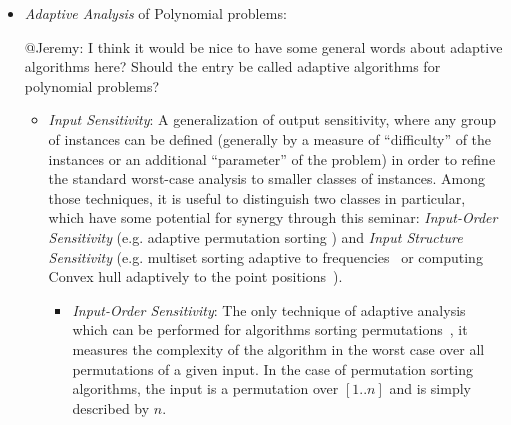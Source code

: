 \documentclass[a4paper,10pt]{article}
\begin{document}
\begin{itemize}

\item \emph{Adaptive Analysis} of Polynomial problems:
\begin{TODO}
\begin{STEFAN}
@Jeremy: I think it would be nice to have some general words about adaptive algorithms here? Should the entry be called adaptive algorithms for polynomial problems?
\end{STEFAN}
\end{TODO}
  \begin{itemize}

\item \emph{Input Sensitivity}: A generalization of output sensitivity, where any group of instances can be defined (generally by a measure of ``difficulty'' of the instances or an additional ``parameter'' of the problem) in order to refine the standard worst-case analysis to smaller classes of instances. Among those techniques, it is useful to distinguish two classes in particular, which have some potential for synergy through this seminar: \emph{Input-Order Sensitivity} (e.g. adaptive permutation sorting \cite{1992-ACMCS-ASurveyOfAdaptiveSortingAlgorithms-EstivillCastroWood,1992-ACJ-AnOverviewOfAdaptiveSorting-MoffatPetersson}) and \emph{Input Structure Sensitivity} (e.g. multiset sorting adaptive to frequencies~\cite{2017-CPM-SynergisticSortingAndDeferredDataStructuresOnMultiSets-BarbayOchoaRao} or computing Convex hull adaptively to the point positions~\cite{2017-JACM-InstanceOptimalGeometricAlgorithms-AfshaniBarbayChan}).
  \begin{LONG}
  \begin{itemize}
\item \emph{Input-Order Sensitivity}: The only technique of adaptive analysis which can be performed for algorithms sorting permutations~\cite{1992-ACMCS-ASurveyOfAdaptiveSortingAlgorithms-EstivillCastroWood,1995-DAM-AFrameworkForAdaptiveSorting-PeterssonMoffat,2013-TCS-CompressedRepresentationsOfPermutationsAndApplications-BarbayNavarro,2012-TCS-LRMTreesCompressedIndicesAdaptiveSortingAndCompressedPermutations-BarbayFischerNavarro,1994-IC-SortingShuffledMonotoneSequences-LevcopoulosPetersson,1985-TCom-MeasuresOfPresortednessAndOptimalSortingAlgorithms-Mannila,1979-CTCS-SortingPresortedFiles-Mehlhorn,1980-CACM-BestSortingAlgorithmForNearlySortedLists-CookKim,1958-InfAndC-SortingTreesAndMeasuresOfORder-Burge}, it measures the complexity of the algorithm in the worst case over all permutations of a given input. In the case of permutation sorting algorithms, the input is a permutation over $[1..n]$ and is simply described by $n$.


\end{itemize}
\end{LONG}
\end{itemize}
\end{itemize}
\end{document}

